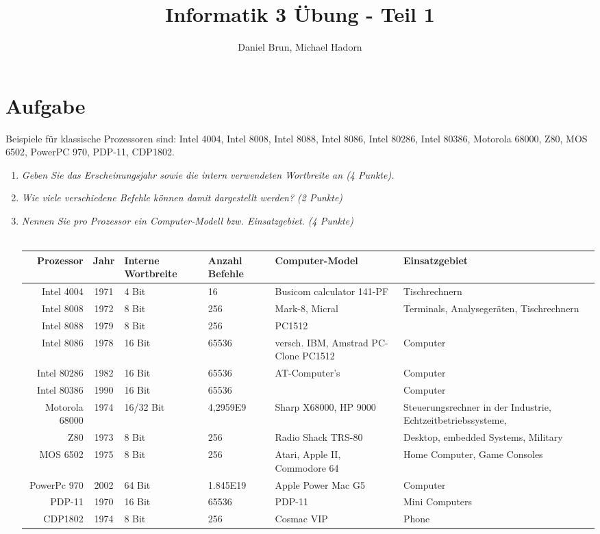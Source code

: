 \documentclass[10pt]{article}
\title{Informatik 3 Übung - Teil 1\vspace{-2ex}}
\author{Daniel Brun, Michael Hadorn\vspace{-2ex}}
\begin{document}
\maketitle

\section{Aufgabe}
Beispiele für klassische Prozessoren sind: Intel 4004, Intel 8008, Intel 8088, Intel 8086, Intel 80286, Intel 80386, Motorola 68000, Z80, MOS 6502, PowerPC 970, PDP-11, CDP1802.

\begin{enumerate}[label=\alph*)]
	\item 
	\textit{Geben Sie das Erscheinungsjahr sowie die intern verwendeten Wortbreite an (4 Punkte).}
	\item
	\textit{Wie viele verschiedene Befehle können damit dargestellt werden? (2 Punkte)}\\
	\item
	\textit{Nennen Sie pro Prozessor ein Computer-Modell bzw. Einsatzgebiet. (4 Punkte)}\\\\
	\begin{tabular}{r | c P{1.8cm} P{1.5cm} p{2cm} p{2cm} }
		Prozessor & Jahr & Interne Wortbreite & Anzahl Befehle & Computer-Model & Einsatzgebiet \\
		\hline
		Intel 4004 & 1971 & 4 Bit & 16 & Busicom calculator 141-PF & Tischrechnern \\
		Intel 8008 & 1972 & 8 Bit & 256 & Mark-8, Micral & Terminals, Analysegeräten, Tischrechnern \\
		Intel 8088 & 1979 & 8 Bit & 256  & PC1512 & \\
		Intel 8086 & 1978 & 16 Bit & 65536 & versch. IBM, Amstrad PC-Clone PC1512 & Computer \\
		Intel 80286 & 1982 & 16 Bit & 65536 & AT-Computer's & Computer \\
		Intel 80386 & 1990 & 16 Bit & 65536 &  & Computer \\
		Motorola 68000 & 1974 & 16/32 Bit & 4,2959E9 & Sharp X68000, HP 9000 & Steuerungsrechner in der Industrie, Echtzeitbetriebssysteme,  \\
		Z80 & 1973 & 8 Bit & 256 & Radio Shack TRS-80 &  Desktop, embedded Systems, Military\\
		MOS 6502 & 1975 & 8 Bit & 256 &  Atari, Apple II, Commodore 64 & Home Computer, Game Consoles\\
		PowerPc 970 & 2002 & 64 Bit & 1.845E19 & Apple Power Mac G5 & Computer \\
		PDP-11 & 1970 & 16 Bit & 65536 & PDP-11 & Mini Computers \\
		CDP1802 & 1974 & 8 Bit & 256 & Cosmac VIP & Phone \\
	\end{tabular}
	
\end{enumerate}
\newpage
\end{document}
